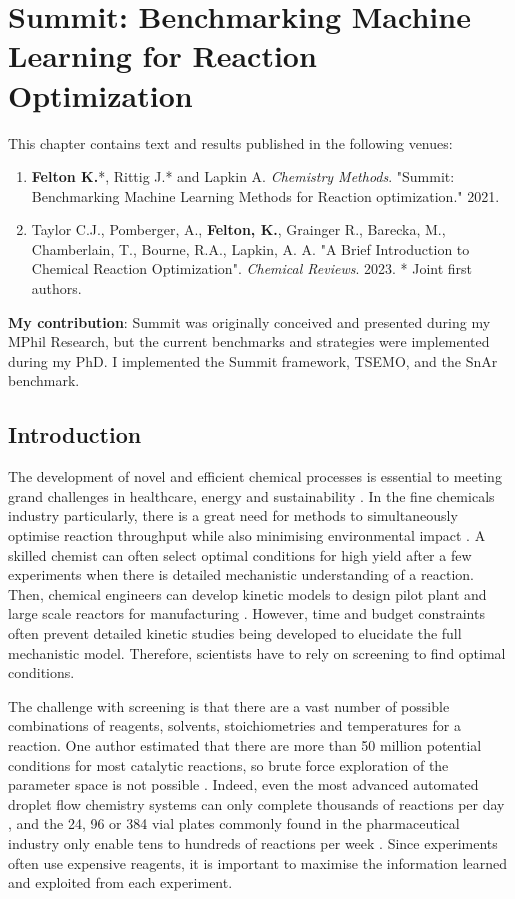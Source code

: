 \chapter{Summit: Benchmarking Machine Learning for Reaction Optimization}\label{ch:summit}

This chapter contains text and results published in the following venues:

\begin{enumerate}
\item \textbf{Felton K.}*, Rittig J.* and Lapkin A. \textit{Chemistry Methods}. "Summit: Benchmarking Machine Learning Methods for Reaction optimization." 2021.
\item Taylor C.J., Pomberger, A., \textbf{Felton, K.}, Grainger R., Barecka, M., Chamberlain, T., Bourne, R.A., Lapkin, A. A. "A Brief Introduction to Chemical Reaction Optimization". \textit{Chemical Reviews}. 2023.
* Joint first authors.
\end{enumerate}
\textbf{My contribution}: Summit was originally conceived and presented during my MPhil Research, but the current benchmarks and strategies were implemented during my PhD. I implemented the Summit framework, TSEMO, and the SnAr benchmark.


\section{Introduction}
The development of novel and efficient chemical processes is essential to meeting grand challenges in healthcare, energy and sustainability \cite{Sheldon2018,Rogers2019}. In the fine chemicals industry particularly, there is a great need for methods to simultaneously optimise reaction throughput while also minimising environmental impact \cite{Schweidtmann2018}. A skilled chemist can often select optimal conditions for high yield after a few experiments when there is detailed mechanistic understanding of a reaction. Then, chemical engineers can develop kinetic models to design pilot plant and large scale reactors for manufacturing \cite{Roberts2008}. However, time and budget constraints often prevent detailed kinetic studies being developed to elucidate the full mechanistic model. Therefore, scientists have to rely on screening to find optimal conditions. 

The challenge with screening is that there are a vast number of possible combinations of reagents, solvents, stoichiometries and temperatures for a reaction. One author estimated that there are more than 50 million potential conditions for most catalytic reactions, so brute force exploration of the parameter space is not possible \cite{Murray2013}. Indeed, even the most advanced automated droplet flow chemistry systems can only complete thousands of reactions per day \cite{Perera2018}, and the 24, 96 or 384 vial plates commonly found in the pharmaceutical industry only enable tens to hundreds of reactions per week \cite{BuitragoSantanilla2015, Shevlin2017, Mennen2019}. Since experiments often use expensive reagents, it is important to maximise the information learned and exploited from each experiment.

